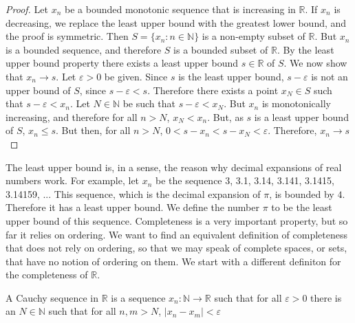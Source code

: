 \documentclass[crop=false,class=article,oneside]{standalone}
\begin{document}
            \begin{proof}
                Let $x_{n}$ be a bounded monotonic sequence that is
                increasing in $\mathbb{R}$. If $x_{n}$ is decreasing, we
                replace the least upper bound with the greatest lower
                bound, and the proof is symmetric.
                Then $S=\{x_{n}:n\in\mathbb{N}\}$ is a
                non-empty subset of $\mathbb{R}$. But $x_{n}$ is
                a bounded sequence, and therefore $S$ is a bounded
                subset of $\mathbb{R}$.
                By the least upper bound property
                there exists a least upper bound $s\in\mathbb{R}$ of
                $S$. We now show that $x_{n}\rightarrow{s}$. Let
                $\varepsilon>0$ be given.
                Since $s$ is the least upper bound,
                $s-\varepsilon$ is not an upper bound of $S$, since
                $s-\varepsilon<s$. Therefore there exists a point
                $x_{N}\in{S}$ such that $s-\varepsilon<x_{n}$.
                Let $N\in\mathbb{N}$ be such that $s-\varepsilon<x_{N}$.
                But $x_{n}$ is monotonically increasing, and therefore
                for all $n>N$, $x_{N}<x_{n}$.
                But, as $s$ is a least upper
                bound of $S$, $x_{n}\leq{s}$. But then, for all $n>N$,
                $0<s-x_{n}<s-x_{N}<\varepsilon$.
                Therefore, $x_{n}\rightarrow{s}$
            \end{proof}
            The least upper bound is, in a sense, the
            reason why decimal expansions of
            real numbers work. For example, let $x_{n}$ be the
            sequence 3, 3.1, 3.14, 3.141, 3.1415, 3.14159, ...
            This sequence, which is the decimal expansion of $\pi$,
            is bounded by $4$. Therefore it has a least upper
            bound. We define the number $\pi$ to be the least upper
            bound of this sequence. Completeness is a very important
            property, but so far it relies on ordering.
            We want to find an equivalent definition of completeness
            that does not rely on ordering, so that we may speak of
            complete spaces, or sets, that have no notion of
            ordering on them.
            We start with a different definiton for the completeness
            of $\mathbb{R}$.
            \begin{definition}
                A Cauchy sequence in $\mathbb{R}$ is a sequence
                $x_{n}:\mathbb{N}\rightarrow\mathbb{R}$ such that
                for all $\varepsilon>0$ there is an $N\in\mathbb{N}$
                such that for all $n,m>N$, $|x_{n}-x_{m}|<\varepsilon$
            \end{definition}
\end{document}
